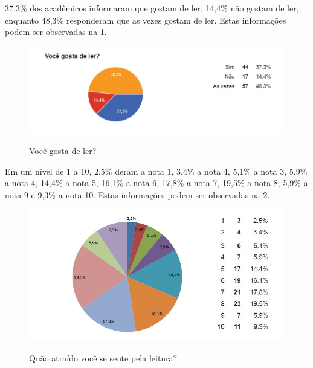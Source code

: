 \documentclass[
	article,			%
	11pt,				%
	oneside,			%
	a4paper,			%
	english,			%
	brazil,				%
	sumario=tradicional
	]{abntex2}
\begin{document}
37,3\% dos acadêmicos informaram que gostam de ler, 14,4\% não gostam de ler, enquanto 48,3\% responderam que as vezes gostam de ler. Estas informações podem ser observadas na \figurename{ \ref{gosta}}.

\begin{figure}[h]  
	\begin{center} 
		\begin{center}
			\changecaptionwidth 
			\captionwidth{13.5cm} %
			\caption{\label{gosta} Você gosta de ler?}
			{\includegraphics[scale=0.8]{imagens/gostaler}}
		\end{center}
	\end{center}
\end{figure}
\FloatBarrier


Em um nível de 1 a 10, 2,5\% deram a nota 1, 3,4\% a nota 4, 5,1\% a nota 3, 5,9\% a nota 4, 14,4\% a nota 5, 16,1\% a nota 6, 17,8\% a nota 7, 19,5\% a nota 8, 5,9\% a nota 9 e 9,3\% a nota 10. Estas informações podem ser observadas na \figurename{ \ref{atraido}}.

\begin{figure}[h]  
	\begin{center} 
		\begin{center}
			\changecaptionwidth 
			\captionwidth{13.5cm} %
			\caption{\label{atraido} Quão atraído você se sente pela leitura?}
			{\includegraphics[scale=0.8]{imagens/atraido}}
		\end{center}
	\end{center}
\end{figure}
\FloatBarrier
\end{document}
